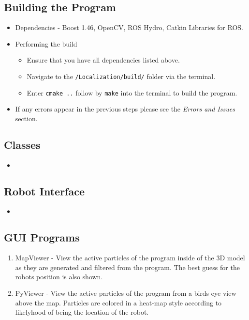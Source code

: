 \documentclass[a4paper,11pt]{article}
\begin{document}
  \subsection{Building the Program}
    \begin{itemize}
    \item Dependencies - Boost 1.46, OpenCV, ROS Hydro, Catkin Libraries for ROS.
    \item Performing the build
     \begin{itemize}
     \item Ensure that you have all dependencies listed above.
     \item Navigate to the \texttt{/Localization/build/} folder via the terminal.
     \item Enter \texttt{cmake ..} follow by \texttt{make} into the terminal to build the program.
     \end{itemize}
   \item If any errors appear in the previous steps please see the \emph{Errors and Issues} section.
  \end{itemize}

  
  \subsection{Classes}
  \begin{itemize}
   \item 
  \end{itemize}
  
  \subsection{Robot Interface}
  \begin{itemize}
   \item 
  \end{itemize}
  
  \subsection{GUI Programs}
  \begin{enumerate}
   \item MapViewer - View the active particles of the program inside of the 3D model as they are generated and filtered from the program. The best guess for the robots position is also shown.
   \item PyViewer  - View the active particles of the program from a birds eye view above the map. Particles are colored in a heat-map style according to likelyhood of being the location of the robot.
  \end{enumerate}
  
\end{document}
